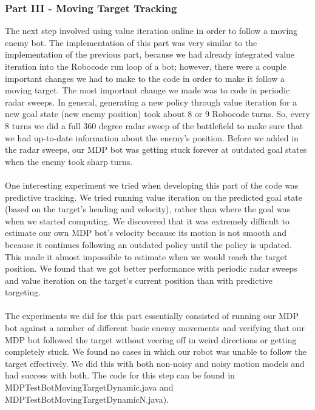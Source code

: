 \documentclass{aiaa-tc}%
\begin{document}
\subsubsection{Part III - Moving Target Tracking}
The next step involved using value iteration online in order to follow a moving enemy bot. The implementation of this part was very similar to the implementation of the previous part, because we had already integrated value iteration into the Robocode run loop of a bot; however, there were a couple important changes we had to make to the code in order to make it follow a moving target. The most important change we made was to code in periodic radar sweeps. In general, generating a new policy through value iteration for a new goal state (new enemy position) took about 8 or 9 Robocode turns. So, every 8 turns we did a full 360 degree radar sweep of the battlefield to make sure that we had up-to-date information about the enemy's position. Before we added in the radar sweeps, our MDP bot was getting stuck forever at outdated goal states when the enemy took sharp turns. \\ \\
One interesting experiment we tried when developing this part of the code was predictive tracking. We tried running value iteration on the predicted goal state (based on the target's heading and velocity), rather than where the goal was when we started computing. We discovered that it was extremely difficult to estimate our own MDP bot's velocity because its motion is not smooth and because it continues following an outdated policy until the policy is updated. This made it almost impossible to estimate when we would reach the target position. We found that we got better performance with periodic radar sweeps and value iteration on the target's current position than with predictive targeting. \\ \\
 The experiments we did for this part essentially consisted of running our MDP bot against a number of different basic enemy movements and verifying that our MDP bot followed the target without veering off in weird directions or getting completely stuck. We found no cases in which our robot was unable to follow the target effectively. We did this with both non-noisy and noisy motion models and had success with both. The code for this step can be found in MDPTestBotMovingTargetDynamic.java and MDPTestBotMovingTargetDynamicN.java).
\end{document}
